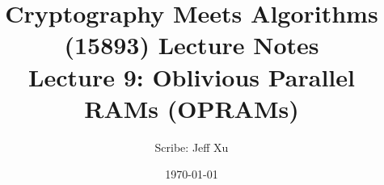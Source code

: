 \documentclass[11pt]{article}
\title{{\Large Cryptography Meets Algorithms (15893) Lecture Notes}\\[5pt]
{\bf Lecture 9: Oblivious Parallel RAMs (OPRAMs)}}
\author{Scribe: Jeff Xu}
\date{\today}
\theoremstyle{definition}
\begin{document}
\maketitle


{

}


\end{document}
